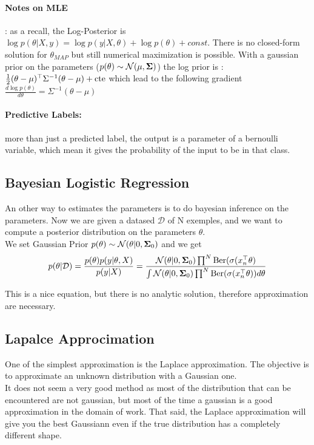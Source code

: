 				\paragraph*{Notes on MLE} : as a recall, the Log-Posterior is $\log p(\theta | X, y) = \log p(y | X, \theta)+\log p(\theta) + const $. There is no closed-form solution for $\theta_{MAP}$ but still numerical maximization is possible. With a gaussian prior on the parameters ($p(\theta) \sim \mathcal{N}(\mu, {\boldsymbol{{\Sigma}}})$) the log prior is : $\frac{1}{2}(\theta - \mu)^\top \Sigma ^{-1} (\theta - \mu) + \text{cte}$ which lead to the following gradient $\frac{d \log p(\theta)}{d\theta} = \Sigma^{-1} (\theta - \mu)$


			\paragraph*{Predictive Labels: } more than just a predicted label, the output is a parameter of a bernoulli variable, which mean it gives the probability of the input to be in that class. 

		\subsection{Bayesian Logistic Regression}
			An other way to estimates the parameters is to do bayesian inference on the parameters.
			Now we are given a datased $\mathcal{D}$ of N exemples, and we want to compute a posterior distribution on the parameters $\theta$. \\
			We set Gaussian Prior $p(\theta) \sim \mathcal{N}(\theta |0, {\boldsymbol{{\Sigma}}}_0)$ and we get 
			\[
				p(\theta | \mathcal{D}) = \frac{p(\theta)p(y|\theta , X)}{p(y|X)} = \frac{\mathcal{N}(\theta |0, {\boldsymbol{{\Sigma}}}_0)\prod^N \text{Ber}(\sigma(x_n ^\top \theta)}{\int \mathcal{N}(\theta |0, {\boldsymbol{{\Sigma}}}_0)\prod^N \text{Ber}(\sigma(x_n ^\top \theta))d\theta}
			\]

			This is a nice equation, but there is no analytic solution, therefore approximation are necessary.

		\subsection{Lapalce Approcimation}
			One of the simplest approximation is the Laplace approximation. The objective is to approximate an unknown distribution with a Gaussian one.\\
			It does not seem a very good method as most of the distribution that can be encountered are not gaussian, but most of the time a gaussian is a good approximation in the domain of work. That said, the Laplace approximation will give you the best Gaussiann even if the true distribution has a completely different shape.

